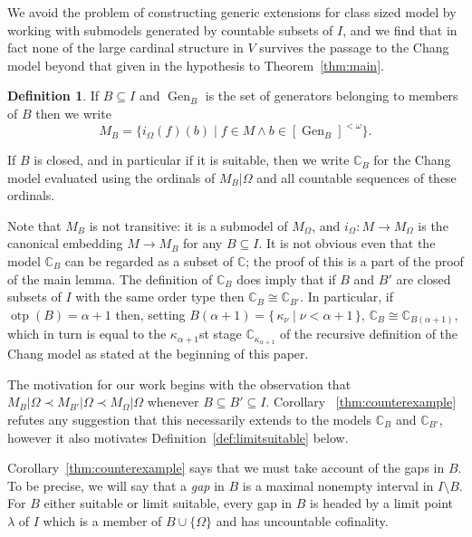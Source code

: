 \documentclass[
twoside,
]{article}
\theoremstyle{definition}
\newtheorem{definition}[theorem]{Definition}
\theoremstyle{remark}
\newcommand{\LS}{limit suitable}
\DeclareMathOperator{\otp}{otp}
\newcommand{\ords}{\Omega}
\newcommand{\cut}{{\vert}}
\newcommand{\sing}[1]{\{#1\}}
\newcommand{\set}[1]{\{\,#1\,\}}
\DeclareMathOperator{\gen}{Gen}
\newcommand\chang{\mathbb{C}}
\begin{document}
We avoid the problem of constructing generic extensions for class sized
model by working with submodels generated by countable subsets of $I$,
and we find that in fact none of the large cardinal structure in $V$
survives the passage to the Chang model beyond that given in the
hypothesis to Theorem~\ref{thm:main}.

\begin{definition}
  If $B\subseteq I$ and $\gen_B$ is the set of generators belonging to members of $B$ then we write
  \begin{equation*}
    M_{B} = \{i_{\Omega}(f)(b)\mid  f\in M \land b\in[\gen_B]^{<\omega}\}.
  \end{equation*}
  
  If $B$ is closed, and in particular if it is suitable, then we write $\chang_{B}$ for the Chang model 
  evaluated using the ordinals of $M_B\cut\ords$ and all countable
  sequences of these ordinals.
\end{definition}

Note
that $M_B$ is not transitive: it is a submodel of $M_{\Omega}$, and 
$i_{\ords}: M\to M_\ords$ is  
the canonical embedding  $M\to M_B$ for any $B\subseteq I$.  It is not
obvious even that the model $\chang_B$ can be regarded as a subset of
$\chang$; the proof of this is a part of the proof of the main lemma. 
The definition of $\chang_{B}$ does imply that if $B$ and $B'$ are
closed subsets of $I$ with the same
order type then $\chang_{B}\cong
\chang_{B'}$.   In particular, if $\otp(B)=\alpha+1$ then, setting
$B(\alpha+1)=\set{\kappa_\nu\mid \nu<\alpha+1}$, 
$\chang_{B}\cong \chang_{B(\alpha+1)}$, which in turn is equal to the
$\kappa_{\alpha+1}$st stage $\chang_{\kappa_{\alpha+1}}$ of the
recursive definition of the Chang model as stated at the beginning of
this paper.

The motivation for our work begins with the observation that  $M_{B}\cut
\ords\prec M_{B'}\cut\ords\prec M_{\ords}\cut\ords$ whenever 
$B\subseteq B'\subseteq I$.   
Corollary ~\ref{thm:counterexample} refutes any suggestion that this 
necessarily extends to the models $\chang_B$ and $\chang_{B'}$,
however it also  motivates
Definition~\ref{def:limitsuitable} below.  

Corollary~\ref{thm:counterexample}  says that we must take account of the gaps in $B$.
To be precise, we will say that a \emph{gap} in $B$ is a maximal 
nonempty 
interval in $I\setminus B$.    For $B$ either suitable or \LS{},
every gap in $B$ is  headed by a limit point $\lambda$ of 
$I$  which is a member of $B\cup\sing{\ords}$ and has uncountable cofinality.
\end{document}
